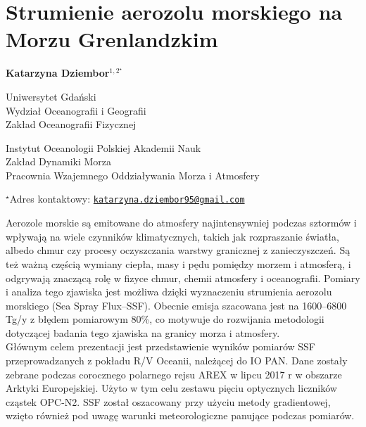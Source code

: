 \documentclass[\main/boa.tex]{subfiles}
\begin{document}
\section{Strumienie aerozolu morskiego na Morzu Grenlandzkim }

\begin{center}
  {\bf {} Katarzyna Dziembor$^{1,2^\star}$ }
\end{center}

\vskip 0.3cm

\begin{affiliations}
\begin{enumerate}
\begin{minipage}{0.915\textwidth}
\centering
\item Uniwersytet Gdański\\ Wydział Oceanografii i Geografii\\ Zakład Oceanografii Fizycznej
\item Instytut Oceanologii Polskiej Akademii Nauk \\ Zakład Dynamiki Morza \\ Pracownia Wzajemnego Oddziaływania Morza i Atmosfery\\[-2pt]
\end{minipage}
\end{enumerate}
$^\star$Adres kontaktowy: \href{mailto:katarzyna.dziembor95@gmail.com}{\nolinkurl{katarzyna.dziembor95@gmail.com}}\\
\end{affiliations}

\vskip 0.5cm


\vskip 0.5cm

Aerozole morskie są emitowane do atmosfery najintensywniej podczas sztormów i wpływają na wiele czynników klimatycznych, takich jak rozpraszanie światła, albedo chmur czy procesy oczyszczania warstwy granicznej z zanieczyszczeń. Są też ważną częścią wymiany ciepła, masy i pędu pomiędzy morzem i atmosferą, i odgrywają znaczącą rolę w fizyce chmur, chemii atmosfery i oceanografii. Pomiary i analiza tego zjawiska jest możliwa dzięki wyznaczeniu strumienia aerozolu morskiego (Sea Spray Flux--SSF). Obecnie emisja szacowana jest na 1600–6800 Tg/y z błędem pomiarowym 80\%, co motywuje do rozwijania metodologii dotyczącej badania tego zjawiska na granicy morza i atmosfery. \\
Głównym celem prezentacji jest przedstawienie wyników pomiarów SSF przeprowadzanych z pokładu R/V Oceanii, należącej do IO PAN. Dane zostały zebrane podczas corocznego polarnego rejsu AREX w lipcu 2017 r w obszarze Arktyki Europejskiej. Użyto w tym celu zestawu pięciu optycznych liczników cząstek OPC-N2. SSF został oszacowany przy użyciu metody gradientowej, wzięto również pod uwagę warunki meteorologiczne panujące podczas pomiarów.
\end{document}
